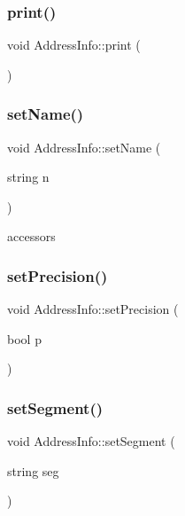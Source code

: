 \mbox{\label{classAddressInfo_a2c82626af62f839742cfa6797f257e6f}} 
\subsubsection{\texorpdfstring{print()}{print()}}
{\footnotesize\ttfamily void Address\+Info\+::print (\begin{DoxyParamCaption}{ }\end{DoxyParamCaption})}

\mbox{\label{classAddressInfo_a37271fcb2207dc8b7f816907760fc721}} 
\subsubsection{\texorpdfstring{set\+Name()}{setName()}}
{\footnotesize\ttfamily void Address\+Info\+::set\+Name (\begin{DoxyParamCaption}\item[{string}]{n }\end{DoxyParamCaption})}

accessors \mbox{\label{classAddressInfo_a5c8bf00c9f0816ef0dc9794317434418}} 
\subsubsection{\texorpdfstring{set\+Precision()}{setPrecision()}}
{\footnotesize\ttfamily void Address\+Info\+::set\+Precision (\begin{DoxyParamCaption}\item[{bool}]{p }\end{DoxyParamCaption})}

\mbox{\label{classAddressInfo_a9e530ba6525d74f46da29705a032e84c}} 
\subsubsection{\texorpdfstring{set\+Segment()}{setSegment()}}
{\footnotesize\ttfamily void Address\+Info\+::set\+Segment (\begin{DoxyParamCaption}\item[{string}]{seg }\end{DoxyParamCaption})}


